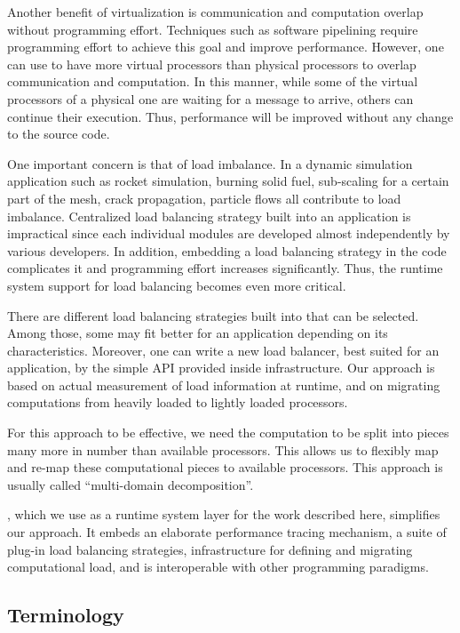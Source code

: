 \documentclass[10pt]{article}
\begin{document}
Another benefit of virtualization is communication and computation overlap without programming effort. Techniques such as software pipelining require programming effort to achieve this goal and improve performance. However, one can use \ampi{} to have more virtual processors than physical processors to overlap communication and computation. In this manner, while some of the virtual processors of a physical one are waiting for a message to arrive, others can continue their execution. Thus, performance will be improved without any change to the source code.

One important concern is that of load imbalance. In a dynamic simulation application
such as rocket simulation, burning  solid fuel, sub-scaling for a certain part
of the mesh, crack propagation, particle flows all contribute to load
imbalance. Centralized load balancing strategy built into an application is
impractical since each individual modules are developed almost independently by
various developers. In addition, embedding a load balancing strategy in the code complicates it and programming effort increases significantly. Thus, the runtime system support for load balancing becomes
even more critical.

There are different load balancing strategies built into \charmpp{} that can be selected. Among those, some may fit better for an application depending on its characteristics. Moreover, one can write a new load balancer, best suited for an application, by the simple API provided inside \charmpp{} infrastructure. Our approach is
based on actual measurement of load information at runtime, and on migrating
computations from heavily loaded to lightly loaded processors.

For this approach to be effective, we need the computation to be split into
pieces many more in number than available processors. This allows us to
flexibly map and re-map these computational pieces to available processors.
This approach is usually called ``multi-domain decomposition''.

\charmpp{}, which we use as a runtime system layer for the work described here,
simplifies our approach. It embeds an elaborate performance tracing mechanism,
a suite of plug-in load balancing strategies, infrastructure for defining and
migrating computational load, and is interoperable with other programming
paradigms.

\subsection{Terminology}
\end{document}
